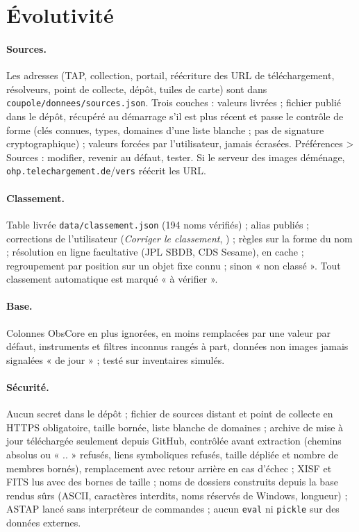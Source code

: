 \section{Évolutivité}\label{chap:evolutif}
\paragraph{Sources.} Les adresses (TAP, collection, portail, réécriture des URL de téléchargement, résolveurs,
point de collecte, dépôt, tuiles de carte) sont dans \texttt{coupole/donnees/sources.json}. Trois couches : valeurs
livrées ; fichier publié dans le dépôt, récupéré au démarrage s'il est plus récent et passe le contrôle de forme
(clés connues, types, domaines d'une liste blanche ; pas de signature cryptographique) ; valeurs forcées par
l'utilisateur, jamais écrasées. Préférences > Sources : modifier, revenir au défaut, tester. Si le serveur des
images déménage, \texttt{ohp.telechargement.de}/\texttt{vers} réécrit les URL.
\paragraph{Classement.} Table livrée \texttt{data/classement.json} (194 noms vérifiés) ; alias publiés ; corrections
de l'utilisateur (\emph{Corriger le classement}, ) ; règles sur la forme du nom ; résolution
en ligne facultative (JPL SBDB, CDS Sesame), en cache ; regroupement par position sur un objet fixe connu ; sinon
« non classé ». Tout classement automatique est marqué « à vérifier ».
\paragraph{Base.} Colonnes ObsCore en plus ignorées, en moins remplacées par une valeur par défaut, instruments et
filtres inconnus rangés à part, données non images jamais signalées « de jour » ; testé sur inventaires simulés.
\paragraph{Sécurité.} Aucun secret dans le dépôt ; fichier de sources distant et point de collecte en HTTPS
obligatoire, taille bornée, liste blanche de domaines ; archive de mise à jour téléchargée seulement depuis GitHub,
contrôlée avant extraction (chemins absolus ou « .. » refusés, liens symboliques refusés, taille dépliée et nombre de
membres bornés), remplacement avec retour arrière en cas d'échec ; XISF et FITS lus avec des bornes de taille ; noms
de dossiers construits depuis la base rendus sûrs (ASCII, caractères interdits, noms réservés de Windows, longueur) ;
ASTAP lancé sans interpréteur de commandes ; aucun \texttt{eval} ni \texttt{pickle} sur des données externes.

